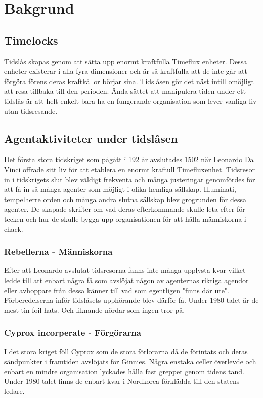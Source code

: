 \documentclass[a5paper,10pt]{report}
\begin{document}
\maketitle
%

\clearpage
\chapter{Bakgrund}
\section{Timelocks}
Tidslås skapas genom att sätta upp enormt kraftfulla Timeflux enheter. Dessa enheter existerar i alla fyra dimensioner och är så kraftfulla att de inte går att förgöra förens deras kraftkällor börjar sina. Tidslåsen gör det näst intill omöjligt att resa tillbaka till den perioden. Ända sättet att manipulera tiden under ett tidslås är att helt enkelt bara ha en fungerande organisation som lever vanliga liv utan tidsresande.
\section{Agentaktiviteter under tidslåsen}
Det första stora tidskriget som pågått i 192 år avslutades 1502 när Leonardo Da Vinci offrade sitt liv för att etablera en enormt kraftull Timefluxenhet. Tidsresor in i tidskrigets slut blev väldigt frekventa och många justeringar genomfördes för att få in så många agenter som möjligt i olika hemliga sällskap. Illuminati, tempelherre orden och många andra slutna sällskap blev grogrunden för dessa agenter. De skapade skrifter om vad deras efterkommande skulle leta efter för tecken och hur de skulle bygga upp organisationen för att hålla människorna i chack.
\subsection{Rebellerna - Människorna}
Efter att Leonardo avslutat tidsresorna fanns inte många upplysta kvar vilket ledde till att enbart några få som avslöjat någon av agenternas riktiga agendor eller avhoppare från dessa känner till vad som egentligen "finns där ute". Förberedelserna inför tidslåsets upphörande blev därför få. Under 1980-talet är de mest tin foil hats. Och liknande nördar som ingen tror på.
\subsection{Cyprox incorperate - Förgörarna}
I det stora kriget föll Cyprox som de stora förlorarna då de förintats och deras sändpunkter i framtiden avslöjats för Ginnies. Några enstaka celler överlevde och enbart en mindre organisation lyckades hålla fast greppet genom tidens tand. Under 1980 talet finns de enbart kvar i Nordkorea förklädda till den statens ledare.
\end{document}
